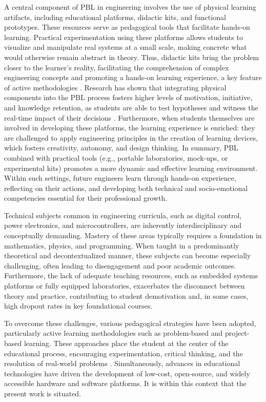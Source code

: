 \documentclass[english]{textolivre}
\begin{document}
A central component of PBL in engineering involves the use of physical learning artifacts, including educational platforms, didactic kits, and functional prototypes. These resources serve as pedagogical tools that facilitate hands-on learning. Practical experimentation using these platforms allows students to visualize and manipulate real systems at a small scale, making concrete what would otherwise remain abstract in theory. Thus, didactic kits bring the problem closer to the learner’s reality, facilitating the comprehension of complex engineering concepts and promoting a hands-on learning experience, a key feature of active methodologies \cite{sant2018kits}. Research has shown that integrating physical components into the PBL process fosters higher levels of motivation, initiative, and knowledge retention, as students are able to test hypotheses and witness the real-time impact of their decisions \cite{sant2018kits, ribeiro2022aprendizagem}. Furthermore, when students themselves are involved in developing these platforms, the learning experience is enriched: they are challenged to apply engineering principles in the creation of learning devices, which fosters creativity, autonomy, and design thinking. In summary, PBL combined with practical tools (e.g., portable laboratories, mock-ups, or experimental kits) promotes a more dynamic and effective learning environment. Within such settings, future engineers learn through hands-on experience, reflecting on their actions, and developing both technical and socio-emotional competencies essential for their professional growth.

Technical subjects common in engineering curricula, such as digital control, power electronics, and microcontrollers, are inherently interdisciplinary and conceptually demanding. Mastery of these areas typically requires a foundation in mathematics, physics, and programming. When taught in a predominantly theoretical and decontextualized manner, these subjects can become especially challenging, often leading to disengagement and poor academic outcomes. Furthermore, the lack of adequate teaching resources, such as embedded systems platforms or fully equipped laboratories, exacerbates the disconnect between theory and practice, contributing to student demotivation and, in some cases, high dropout rates in key foundational courses.

To overcome these challenges, various pedagogical strategies have been adopted, particularly active learning methodologies such as problem-based and project-based learning. These approaches place the student at the center of the educational process, encouraging experimentation, critical thinking, and the resolution of real-world problems \cite{yadav2011problem,picard2022professional}. Simultaneously, advances in educational technologies have driven the development of low-cost, open-source, and widely accessible hardware and software platforms. It is within this context that the present work is situated.
\end{document}
